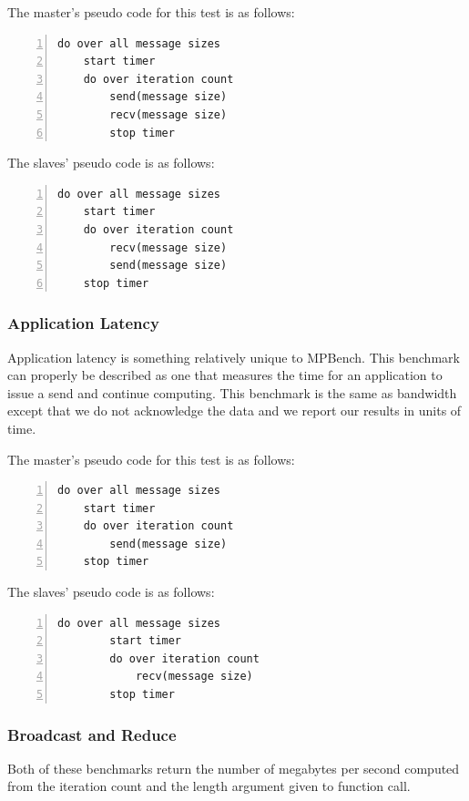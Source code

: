 The master's pseudo code for this test is as follows:

\begin{lstlisting}[frame=single,numbers=left]
  do over all message sizes 
    start timer
    do over iteration count
        send(message size)
        recv(message size) 
        stop timer
\end{lstlisting}

The slaves' pseudo code is as follows:

\begin{lstlisting}[frame=single,numbers=left]
do over all message sizes 
    start timer
    do over iteration count
        recv(message size)
        send(message size)
    stop timer
\end{lstlisting}

\subsubsection{Application Latency}

Application latency is something relatively unique to MPBench. This benchmark
can properly be described as one that measures the time for an application
to issue a send and continue computing. This benchmark is the same as
bandwidth except that we do not acknowledge the data and we report our
results in units of time.

The master's pseudo code for this test is as follows:

\begin{lstlisting}[frame=single,numbers=left]
do over all message sizes 
    start timer
    do over iteration count 
        send(message size) 
    stop timer
\end{lstlisting}    

The slaves' pseudo code is as follows:

\begin{lstlisting}[frame=single,numbers=left]
   do over all message sizes 
        start timer
        do over iteration count 
            recv(message size) 
        stop timer
\end{lstlisting}

\subsubsection{Broadcast and Reduce}

Both of these benchmarks return the number of megabytes per second computed
from the iteration count and the length argument given to function call.

